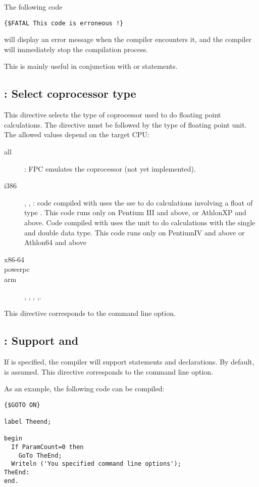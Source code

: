 The following code
\begin{verbatim}
{$FATAL This code is erroneous !}
\end{verbatim}
will display an error message when the compiler encounters it,
and the compiler will immediately stop the compilation process.

This is mainly useful in conjunction with  or
 statements.

\subsection{ : Select coprocessor type}

This directive selects the type of coprocessor used to do floating point
calculations. The directive must be followed by the type of floating point
unit. The allowed values depend on the target CPU:

\begin{description}
\item[all] : FPC emulates the coprocessor (not yet implemented).
\item[i386] , , : code compiled with  
uses the sse to do calculations involving a float of type .
This code runs only on Pentium III and above, or AthlonXP and above.
Code compiled with  uses the  unit to do calculations 
with the single and double data type. This code runs only on PentiumIV 
and above or Athlon64 and above 
\item[x86-64]  
\item[powerpc]  
\item[arm] , , , ,.
\end{description} 

This directive corresponds to the  command line option.

\subsection{ : Support  and }

If  is specified, the compiler will support 
statements and  declarations. By default,  is
assumed. This directive corresponds to the  command line option.

As an example, the following code can be compiled:
\begin{verbatim}
{$GOTO ON}

label Theend;

begin
  If ParamCount=0 then
    GoTo TheEnd;
  Writeln ('You specified command line options');
TheEnd:
end.
\end{verbatim}

